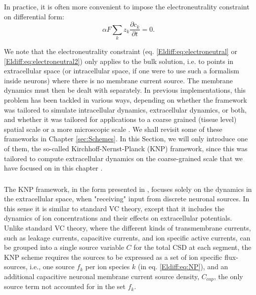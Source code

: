 In practice, it is often more convenient to impose the electroneutrality constraint on differential form:
\begin{equation}
\alpha F \sum_k{z_k \frac{\partial c_k}{\partial t}} = 0.
\label{Eldiff:eq:electroneutral2}
\end{equation}

We note that the electroneutrality constraint (eq. \ref{Eldiff:eq:electroneutral} or \ref{Eldiff:eq:electroneutral2}) only applies to the bulk solution, i.e. to points in extracellular space (or intracellular space, if one were to use such a formalism inside neurons) where there is no membrane current source. The membrane dynamics must then be dealt with separately. In previous implementations, this problem has been tackled in various ways, depending on whether the framework was tailored to simulate intracellular dynamics, extracellular dynamics, or both, and whether it was tailored for applications to a coarse grained (tissue level) spatial scale or a more microscopic scale \citep{Qian1989, Mori2008, Mori2009, Mori2009a, Mori2011, Halnes2015, Halnes2013, Pods2017, Niederer2013, OConnell2016, Solbra2018, tuttle2019, ellingsrud2020}. We shall revisit some of these frameworks in Chapter \ref{sec:Schemes}. In this Section, we will only introduce one of them, the so-called Kirchhoff-Nernst-Planck (KNP) framework, since this was tailored to compute extracellular dynamics on the coarse-grained scale that we have focused on in this chapter \citep{Solbra2018}.


\subsubsection{}
The KNP framework, in the form presented in \cite{Solbra2018}, focuses solely on the dynamics in the extracellular space, when "receiving" input from discrete neuronal sources. In this sense it is similar to standard VC theory, except that it includes the dynamics of ion concentrations and their effects on extracellular potentials. Unlike standard VC theory, where the different kinds of transmembrane currents, such as leakage currents, capacitive currents, and ion specific active currents, can be grouped into a single source variable $C$ for the total CSD at each segment, the KNP scheme requires the sources to be expressed as a set of ion specific flux-sources, i.e., one source $f_k$ per ion species $k$ (in eq. \ref{Eldiff:eq:NP}), and an additional capacitive neuronal membrane current source density, $C_{cap}$, the only source term not accounted for in the set $f_k$.

